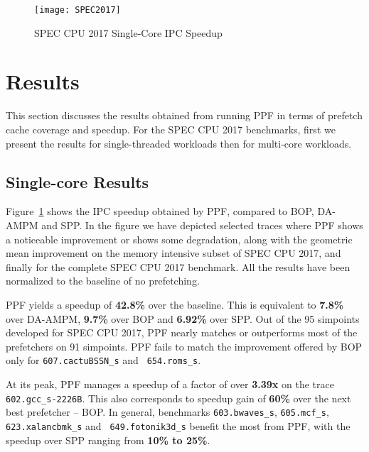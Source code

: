 \begin{figure}[ht]
\texttt{[image: SPEC2017]}
\caption{SPEC CPU 2017 Single-Core IPC Speedup}
\label{Fig:SPEC2017_1core}
\end{figure}

\section{Results}
\label{Results}

This section discusses the results obtained from running PPF in terms of
prefetch cache coverage and speedup. For the SPEC CPU 2017 benchmarks, first
we present the results for single-threaded workloads then for multi-core
workloads.

\subsection{Single-core Results}
\label{Results-Single}


Figure~\ref{Fig:SPEC2017_1core} shows the IPC speedup obtained by PPF,
compared to BOP, DA-AMPM and SPP.  In the figure we have depicted selected
traces where PPF shows a noticeable improvement or shows some degradation,
along with the geometric mean improvement on the memory intensive subset of
SPEC CPU 2017, and finally for the complete SPEC CPU 2017 benchmark.  All the
results have been normalized to the baseline of no prefetching.


PPF yields a speedup of \textbf{42.8\%} over the baseline. This is equivalent
to \textbf{7.8\%} over DA-AMPM, \textbf{9.7\%} over BOP and \textbf{6.92\%}
over SPP.  Out of the 95 simpoints developed for SPEC CPU 2017, PPF nearly
matches or outperforms most of the prefetchers on 91 simpoints.  PPF fails to
match the improvement offered by BOP only for {\tt 607.cactuBSSN\_s} and {\tt
654.roms\_s}.

At its peak, PPF manages a speedup of a factor of over \textbf{3.39x} on the
trace {\tt 602.gcc\_s-2226B}.  This also corresponds to speedup gain of
\textbf{60\%} over the next best prefetcher -- BOP.  In general, benchmarks
{\tt 603.bwaves\_s}, {\tt 605.mcf\_s}, {\tt 623.xalancbmk\_s} and {\tt
649.fotonik3d\_s} benefit the most from PPF, with the speedup over SPP ranging
from \textbf{10\% to 25\%}.

